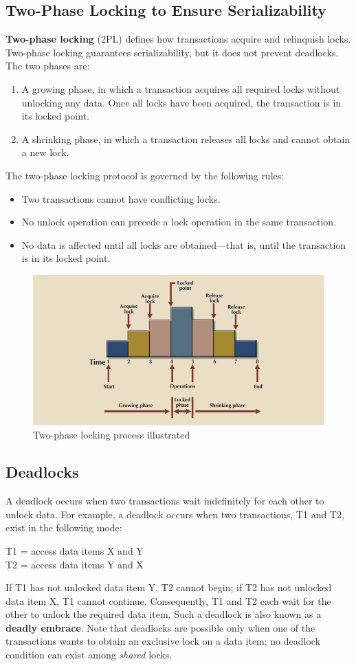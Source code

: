 \documentclass[a4paper, 11pt, titlepage]{report}
\begin{document}
\subsection{Two-Phase Locking to Ensure Serializability}
\textbf{Two-phase locking} (2PL) defines how transactions acquire and relinquish locks. Two-phase locking guarantees serializability, but it does not prevent deadlocks. The two phases are:
\begin{enumerate}
\item A growing phase, in which a transaction acquires all required locks without unlocking any data. Once all locks have been acquired, the transaction is in its locked point.
\item A shrinking phase, in which a transaction releases all locks and cannot obtain a new lock.
\end{enumerate}
The two-phase locking protocol is governed by the following rules:
\begin{itemize}
\item Two transactions cannot have conflicting locks.
\item No unlock operation can precede a lock operation in the same transaction.
\item No data is affected until all locks are obtained—that is, until the transaction is in its
locked point.
\end{itemize}
\begin{figure}[H]
\centering
\includegraphics[scale=0.75]{pics/lock}
\caption{Two-phase locking process illustrated}
\end{figure}
\subsection{Deadlocks}
A deadlock occurs when two transactions wait indefinitely for each other to unlock data. For
example, a deadlock occurs when two transactions, T1 and T2, exist in the following mode:
\begin{center}
T1 = access data items X and Y\\
T2 = access data items Y and X
\end{center}
If T1 has not unlocked data item Y, T2 cannot begin; if T2 has not unlocked data item X, T1 cannot continue. Consequently, T1 and T2 each wait for the other to unlock the required data item. Such a deadlock is also known as a \textbf{deadly embrace}. Note that deadlocks are possible only when one of the transactions wants to obtain an exclusive lock on a data item; no deadlock condition can exist among \textit{shared} locks.
\end{document}
